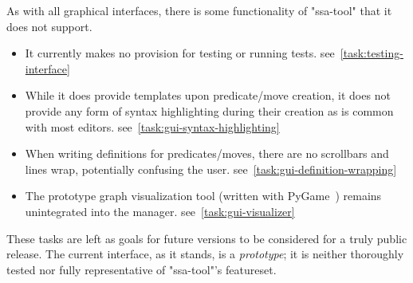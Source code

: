 As with all graphical interfaces,
  there is some functionality of "ssa-tool" that it does not support.
\begin{itemize}
\providecommand\TaskRef[1]{\hfill\mbox{see~\autoref{task:#1}}}
\item It currently makes no provision for testing or running tests.
  \TaskRef{testing-interface}
\item While it does provide templates upon predicate\slash move creation,
  it does not provide any form of syntax highlighting during their creation
  as is common with most editors.
  \TaskRef{gui-syntax-highlighting}
\item When writing definitions for predicates\slash moves,
  there are no scrollbars and lines wrap, potentially confusing the user.
  \TaskRef{gui-definition-wrapping}
\item The prototype graph visualization tool
  (written with PyGame~\autocite{pygame})
  remains unintegrated into the manager.
  \TaskRef{gui-visualizer}
\end{itemize}
These tasks are left as goals for future versions to be considered for a truly public release.
The current interface, as it stands, is a \emph{prototype}; it is neither thoroughly tested
  nor fully representative of "ssa-tool"'s featureset.


